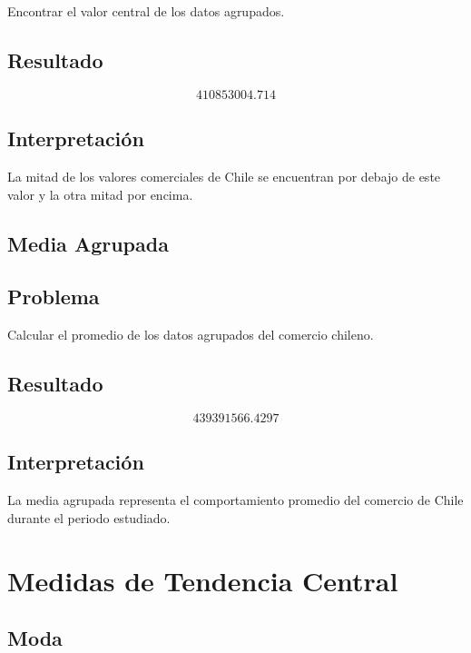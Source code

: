 \documentclass[12pt]{article}
\begin{document}
Encontrar el valor central de los datos agrupados.

\subsection*{Resultado}

\[
410853004.714
\]

\subsection*{Interpretación}

La mitad de los valores comerciales de Chile se encuentran por debajo de este valor y la otra mitad por encima.


\subsection{Media Agrupada}

\subsection*{Problema}

Calcular el promedio de los datos agrupados del comercio chileno.

\subsection*{Resultado}

\[
439391566.4297
\]

\subsection*{Interpretación}

La media agrupada representa el comportamiento promedio del comercio de Chile durante el periodo estudiado.


\section{Medidas de Tendencia Central}

\subsection{Moda}
\end{document}
